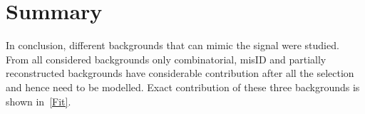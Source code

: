 \section{Summary}
In conclusion, different backgrounds that can mimic the signal were studied. From all considered backgrounds only combinatorial, misID and partially reconstructed backgrounds have considerable contribution after all the selection and hence need to be modelled. Exact contribution of these three backgrounds is shown in~\autoref{Fit}.

